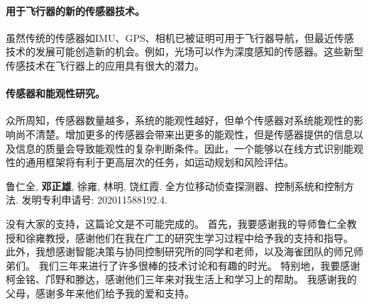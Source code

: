 \documentclass[
  type=master
]{gdutthesis}
\begin{document}
\paragraph{用于飞行器的新的传感器技术。}
虽然传统的传感器如IMU、GPS、相机已被证明可用于飞行器导航，但最近传感技术的发展可能创造新的机会。例如，光场可以作为深度感知的传感器。这些新型传感技术在飞行器上的应用具有很大的潜力。
\paragraph{传感器和能观性研究。}
众所周知，传感器数量越多，系统的能观性越好，但单个传感器对系统能观性的影响尚不清楚。增加更多的传感器会带来出更多的能观性，但是传感器提供的信息以及信息的质量会导致能观性的复杂判断条件。因此，一个能够以在线方式识别能观性的通用框架将有利于更高层次的任务，如运动规划和风险评估。

\nocite{*}%
\printbibliography



\begin{results}
  \item 鲁仁全, \textbf{邓正雄}, 徐雍, 林明, 饶红霞. 全方位移动侦查探测器、控制系统和控制方法. 发明专利申请号: 202011588192.4.
\end{results}

\gdutstatement

没有大家的支持，这篇论文是不可能完成的。
首先，我要感谢我的导师鲁仁全教授和徐雍教授，感谢他们在我在广工的研究生学习过程中给予我的支持和指导。
此外，我想感谢智能决策与协同控制研究所的同学和老师，以及海雀团队的师兄师弟们。
我们三年来进行了许多很棒的技术讨论和有趣的时光。
特别地，我要感谢柯金铭、邝野和滕达，感谢他们三年来对我生活上和学习上的帮助。
我感谢我的父母，感谢多年来他们给予我的爱和支持。

%
\end{document}
